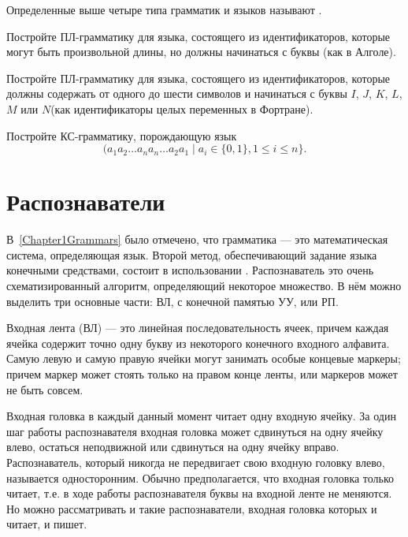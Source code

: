 Определенные выше четыре типа грамматик и языков называют
.

\begin{myproblem}
Постройте ПЛ-грамматику для языка, состоящего из идентификаторов, которые могут быть произвольной длины, но должны начинаться с буквы (как в Алголе).
\end{myproblem}

\begin{myproblem}
Постройте ПЛ-грамматику для языка, состоящего из идентификаторов, которые должны содержать от одного до шести символов и начинаться с буквы $I$, $J$, $K$, $L$, $M$ или $N$(как идентификаторы целых переменных в Фортране).
\end{myproblem}
\begin{myproblem}
Постройте КС-грамматику, порождающую язык
\[
	(a_1a_2 \ldots a_na_n \ldots a_2a_1 \mid
    	a_i\in\{0,1\}, 1\le i\le n\}.
\]
\end{myproblem}

\section{Распознаватели}
\label{Chapter1Parsers}

В~\ref{Chapter1Grammars} было отмечено, что грамматика --- это математическая
система, определяющая язык. Второй метод, обеспечивающий
задание языка конечными средствами, состоит в использовании
. Распознаватель это очень схематизированный
алгоритм, определяющий некоторое множество. В нём можно
выделить три основные части:  ВЛ,
 с конечной памятью УУ,  или  РП.

Входная лента (ВЛ) --- это линейная последовательность ячеек,
причем каждая
ячейка содержит точно одну букву из некоторого конечного входного
алфавита. Самую левую и самую правую ячейки могут занимать особые
концевые маркеры; причем маркер может стоять только на правом конце
ленты, или маркеров может не быть совсем.

Входная головка в каждый данный момент читает одну входную ячейку.
За один шаг работы распознавателя входная головка может
сдвинуться на одну
ячейку влево, остаться неподвижной или сдвинуться на одну ячейку
вправо. Распознаватель, который никогда не передвигает свою входную
головку влево, называется  односторонним. Обычно предполагается, что
входная головка только читает, т.е. в ходе работы распознавателя
буквы на входной ленте не меняются. Но можно рассматривать и такие
распознаватели, входная головка которых и читает, и пишет.

